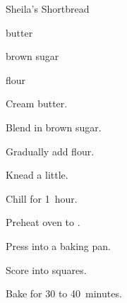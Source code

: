 \begin{recipe}{Sheila's Shortbread}{}{}

\begin{ingredients}
\item {} butter
\item \C{\twothird} brown sugar
\item {} flour
\end{ingredients}

\begin{directions}
\item Cream butter.
\item Blend in brown sugar.
\item Gradually add flour.
\item Knead a little.
\item Chill for 1~hour.
\item Preheat oven to .
\item Press into a baking pan.
\item Score into squares.
\item Bake for 30 to 40~minutes.
\end{directions}
\end{recipe}
